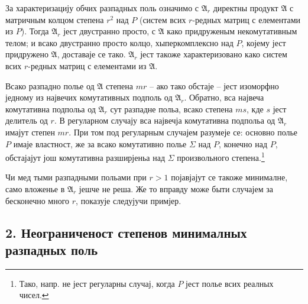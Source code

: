 ﻿\documentclass[11pt]{article}
\newcommand{\mA}{\mathfrak{A}}
\begin{document}
\noindent За характеризацију обчих разпадных поль означимо с $\mA_r$ директны продукт $\mA$ с матричным колцом степена $r^2$ над $P$ (систем всих $r$-редных матриц с елементами из $P$). Тогда $\mA_r$ јест двустранно просто, с $\mA$ како придруженым некомутативным телом; и всако двустранно просто колцо, хыперкомплексно над $P$, којему јест придружено $\mA$, доставаје се тако. $\mA_r$ јест такоже характеризовано како систем всих $r$-редных матриц с елементами из $\mA$.

\medskip

\noindent Всако разпадно полье од $\mA$ степена $mr$ -- ако тако обстаје -- јест изоморфно једному из највечих комутативных подполь од $\mA_r$. Обратно, вса највеча комутативна подпольа од $\mA_r$ сут разпадне польа, всако степена $ms$, кде $s$ јест делитель од $r$. В регуларном случају вса највечја комутативна подпольа од $\mA_r$ имајут степен $mr$. При том под регуларным случајем разумеје се: основно полье $P$ имаје властност, же за всако комутативно полье $\Sigma$ над $P$, конечно над $P$, обстајајут још комутативна разширјеньа над $\Sigma$ произвольного степена.\footnote{Тако, напр. не јест регуларны случај, когда $P$ јест полье всих реалных чисел.}

\medskip

\noindent Чи мед тыми разпадными польами при $r>1$ појавјајут се такоже минималне, само вложенье в $\mA_r$ јешче не реша. Же то вправду може быти случајем за бесконечно много $r$, показује следујучи примјер.

\subsection*{2. Неограниченост степенов минималных разпадных поль}
\end{document}

